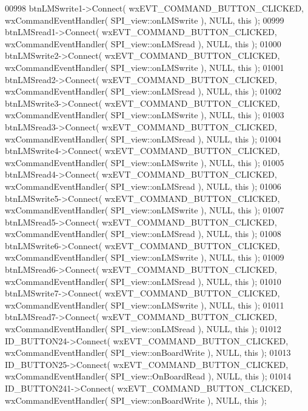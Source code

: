 \begin{DoxyCode}
00998     btnLMSwrite1->Connect( wxEVT\_COMMAND\_BUTTON\_CLICKED, wxCommandEventHandler( 
      SPI_view::onLMSwrite ), NULL, \textcolor{keyword}{this} );
00999     btnLMSread1->Connect( wxEVT\_COMMAND\_BUTTON\_CLICKED, wxCommandEventHandler( 
      SPI_view::onLMSread ), NULL, \textcolor{keyword}{this} );
01000     btnLMSwrite2->Connect( wxEVT\_COMMAND\_BUTTON\_CLICKED, wxCommandEventHandler( 
      SPI_view::onLMSwrite ), NULL, \textcolor{keyword}{this} );
01001     btnLMSread2->Connect( wxEVT\_COMMAND\_BUTTON\_CLICKED, wxCommandEventHandler( 
      SPI_view::onLMSread ), NULL, \textcolor{keyword}{this} );
01002     btnLMSwrite3->Connect( wxEVT\_COMMAND\_BUTTON\_CLICKED, wxCommandEventHandler( 
      SPI_view::onLMSwrite ), NULL, \textcolor{keyword}{this} );
01003     btnLMSread3->Connect( wxEVT\_COMMAND\_BUTTON\_CLICKED, wxCommandEventHandler( 
      SPI_view::onLMSread ), NULL, \textcolor{keyword}{this} );
01004     btnLMSwrite4->Connect( wxEVT\_COMMAND\_BUTTON\_CLICKED, wxCommandEventHandler( 
      SPI_view::onLMSwrite ), NULL, \textcolor{keyword}{this} );
01005     btnLMSread4->Connect( wxEVT\_COMMAND\_BUTTON\_CLICKED, wxCommandEventHandler( 
      SPI_view::onLMSread ), NULL, \textcolor{keyword}{this} );
01006     btnLMSwrite5->Connect( wxEVT\_COMMAND\_BUTTON\_CLICKED, wxCommandEventHandler( 
      SPI_view::onLMSwrite ), NULL, \textcolor{keyword}{this} );
01007     btnLMSread5->Connect( wxEVT\_COMMAND\_BUTTON\_CLICKED, wxCommandEventHandler( 
      SPI_view::onLMSread ), NULL, \textcolor{keyword}{this} );
01008     btnLMSwrite6->Connect( wxEVT\_COMMAND\_BUTTON\_CLICKED, wxCommandEventHandler( 
      SPI_view::onLMSwrite ), NULL, \textcolor{keyword}{this} );
01009     btnLMSread6->Connect( wxEVT\_COMMAND\_BUTTON\_CLICKED, wxCommandEventHandler( 
      SPI_view::onLMSread ), NULL, \textcolor{keyword}{this} );
01010     btnLMSwrite7->Connect( wxEVT\_COMMAND\_BUTTON\_CLICKED, wxCommandEventHandler( 
      SPI_view::onLMSwrite ), NULL, \textcolor{keyword}{this} );
01011     btnLMSread7->Connect( wxEVT\_COMMAND\_BUTTON\_CLICKED, wxCommandEventHandler( 
      SPI_view::onLMSread ), NULL, \textcolor{keyword}{this} );
01012     ID_BUTTON24->Connect( wxEVT\_COMMAND\_BUTTON\_CLICKED, wxCommandEventHandler( 
      SPI_view::onBoardWrite ), NULL, \textcolor{keyword}{this} );
01013     ID_BUTTON25->Connect( wxEVT\_COMMAND\_BUTTON\_CLICKED, wxCommandEventHandler( 
      SPI_view::OnBoardRead ), NULL, \textcolor{keyword}{this} );
01014     ID_BUTTON241->Connect( wxEVT\_COMMAND\_BUTTON\_CLICKED, wxCommandEventHandler( 
      SPI_view::onBoardWrite ), NULL, \textcolor{keyword}{this} );

\end{DoxyCode}
